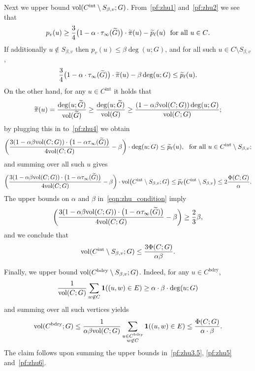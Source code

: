 Next we upper bound $\mathrm{vol}(C^{\mathrm{int}} \setminus S_{\beta,v};G)$. From~\eqref{pf:zhu1} and~\eqref{pf:zhu2} we see that 
\begin{equation*}
p_v(u) \geq \frac{3}{4}\bigl(1 - \alpha \cdot \tau_{\infty}(\widetilde{G})\bigr) \cdot \widetilde{\pi}(u) - \widetilde{p}_{\ell}(u)~~\textrm{for all $u \in C$.}
\end{equation*}
If additionally $u \not\in S_{\beta,v}$ then $p_v(u) \leq \beta \deg(u;G)$, and for all such $u \in C \setminus S_{\beta,v}$,
\begin{equation}
\label{pf:zhu4}
\frac{3}{4}\bigl(1 - \alpha \cdot \tau_{\infty}(\widetilde{G})\bigr) \cdot \widetilde{\pi}(u) -  \beta\deg(u;G) \leq \widetilde{p}_{\ell}(u).
\end{equation}
On the other hand, for any $u \in C^{\mathrm{int}}$ it holds that
\begin{equation*}
\widetilde{\pi}(u) = \frac{\deg(u;\widetilde{G})}{\mathrm{vol}(\widetilde{G})} \geq \frac{\deg(u;\widetilde{G})}{\mathrm{vol}(G)} \geq \frac{(1 - \alpha \beta \mathrm{vol}(C;G))\deg(u;G)}{\mathrm{vol}(C;G)};
\end{equation*}
by plugging this in to~\eqref{pf:zhu4} we obtain
\begin{equation*}
\biggl(\frac{3(1 - \alpha \beta \mathrm{vol}(C;G))\cdot\bigl(1 - \alpha \tau_{\infty}(\widetilde{G})\bigr)}{4\mathrm{vol}(C;G)} - \beta\biggr) \cdot \deg(u;G) \leq \widetilde{p}_{\ell}(u),~~\textrm{for all $u \in C^{\mathrm{int}} \setminus S_{\beta,v}$};
\end{equation*}
and summing over all such $u$ gives
\begin{equation*}
\biggl(\frac{3(1 - \alpha \beta \mathrm{vol}(C;G))\cdot\bigl(1 - \alpha \tau_{\infty}(\widetilde{G})\bigr)}{4\mathrm{vol}(C;G)} - \beta\biggr) \cdot \mathrm{vol}\bigl(C^{\mathrm{int}} \setminus S_{\beta,v}; G\bigr) \leq \widetilde{p}_{\ell}\bigl(C^{\mathrm{int}} \setminus S_{\beta,v}\bigr) \leq 2\frac{\Phi(C;G)}{\alpha}.
\end{equation*}
The upper bounds on $\alpha$ and $\beta$ in~\eqref{eqn:zhu_condition} imply
\begin{equation*}
\biggl(\frac{3(1 - \alpha \beta \mathrm{vol}(C;G))\cdot\bigl(1 - \alpha \tau_{\infty}(\widetilde{G})\bigr)}{4\mathrm{vol}(C;G)} - \beta\biggr) \geq \frac{2}{3}\beta,
\end{equation*}
and we conclude that
\begin{equation}
\label{pf:zhu5}
\mathrm{vol}(C^{\mathrm{int}} \setminus S_{\beta,v}; G) \leq \frac{3\Phi(C;G)}{\alpha\beta}.
\end{equation}

Finally, we upper bound $\mathrm{vol}(C^{\mathrm{bdry}} \setminus S_{\beta,v};G)$. Indeed, for any $u \in C^{\mathrm{bdry}}$,
\begin{equation*}
\frac{1}{\mathrm{vol}(C;G)}\sum_{w \not\in C} \mathbf{1}((u,w) \in E) \geq \alpha \cdot \beta \cdot \deg(u;G)
\end{equation*}
and summing over all such vertices yields
\begin{equation}
\label{pf:zhu6}
\mathrm{vol}(C^{\mathrm{bdry}};G) \leq \frac{1}{\alpha \beta \mathrm{vol}(C;G)}\sum_{\substack{u \in C^{\mathrm{bdry}} \\ w \not\in C}} \mathbf{1}((u,w) \in E) \leq \frac{\Phi(C;G)}{\alpha \cdot \beta}.
\end{equation} 
The claim follows upon summing the upper bounds in~\eqref{pf:zhu3.5}, \eqref{pf:zhu5} and~\eqref{pf:zhu6}.

